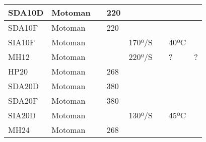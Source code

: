 \begin{longtable}{|p{}|p{}|p{}|p{}|p{}|p{}|p{}|p{}|}
SDA10D & Motoman &  & \cellcolor{red} 220 &  &  &  &  \\ \hline
SDA10F & Motoman &  & \cellcolor{red} 220 &  &  &  &  \\ \hline
\cellcolor{green} SIA10F & Motoman &  &  & 170º/S &  & 40ºC &  \\ \hline
\cellcolor{green} MH12 & Motoman &  &  & 220º/S &  & ? & ? \\ \hline
HP20 & Motoman &  & \cellcolor{red} 268 &  &  &  &  \\ \hline
SDA20D & Motoman &  & \cellcolor{red} 380 &  &  &  &  \\ \hline
SDA20F & Motoman &  & \cellcolor{red} 380 &  &  &  &  \\ \hline
\cellcolor{green} SIA20D & Motoman &  &  & 130º/S &  & 45ºC &  \\ \hline
MH24 & Motoman &  & \cellcolor{red} 268 &  &  &  &  \\ \hline
\end{longtable}